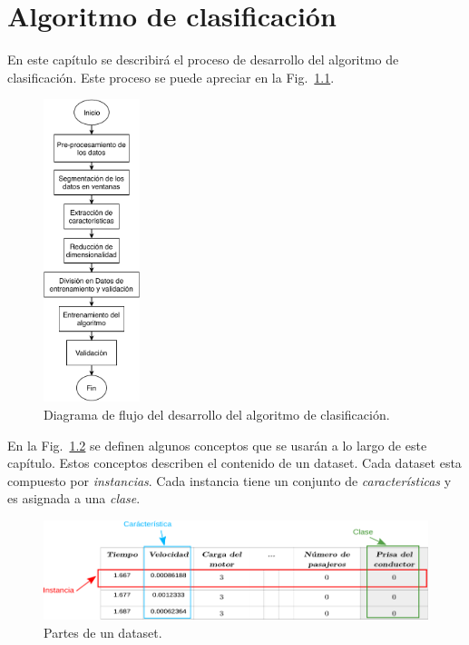 \chapter{Algoritmo de clasificación}
\label{chap:algoritmo}

 \graphicspath{{Chapter5/Figuras/}{Chapter6/Figs/PDF/}{Chapter4/Figs/}}

En este capítulo se describirá el proceso de desarrollo del algoritmo de clasificación. Este proceso se puede apreciar en la Fig.~\ref{fig:Flujo_desarrollo}.

\begin{figure}[hbt!]
\centering
\includegraphics[width=0.25\textwidth]{Flujo_desarrollo.pdf}
\caption{Diagrama de flujo del desarrollo del algoritmo de clasificación.}
\label{fig:Flujo_desarrollo}
\end{figure}

En la Fig.~\ref{fig:datos_ejemplo} se definen algunos conceptos que se usarán a lo largo de este capítulo. Estos conceptos describen el contenido de un dataset. Cada dataset esta compuesto por \textit{instancias}. Cada instancia tiene un conjunto de \textit{características} y es asignada a una \textit{clase}.

\begin{figure}[hbt!]
\centering
\includegraphics[width=\textwidth]{datos_ejemplo.pdf}
\caption{Partes de un dataset.}
\label{fig:datos_ejemplo}
\end{figure}


